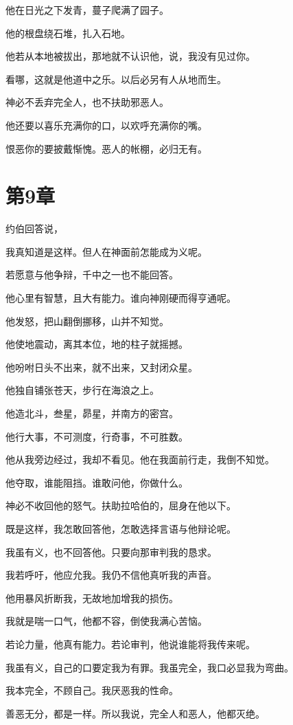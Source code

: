 \documentclass[12pt,oneside]{book}
\begin{document}
他在日光之下发青，蔓子爬满了园子。

他的根盘绕石堆，扎入石地。

他若从本地被拔出，那地就不认识他，说，我没有见过你。

看哪，这就是他道中之乐。以后必另有人从地而生。

神必不丢弃完全人，也不扶助邪恶人。

他还要以喜乐充满你的口，以欢呼充满你的嘴。

恨恶你的要披戴惭愧。恶人的帐棚，必归无有。



\chapter{第9章}
约伯回答说，

我真知道是这样。但人在神面前怎能成为义呢。

若愿意与他争辩，千中之一也不能回答。

他心里有智慧，且大有能力。谁向神刚硬而得亨通呢。

他发怒，把山翻倒挪移，山并不知觉。

他使地震动，离其本位，地的柱子就摇撼。

他吩咐日头不出来，就不出来，又封闭众星。

他独自铺张苍天，步行在海浪之上。

他造北斗，叁星，昴星，并南方的密宫。

他行大事，不可测度，行奇事，不可胜数。

他从我旁边经过，我却不看见。他在我面前行走，我倒不知觉。

他夺取，谁能阻挡。谁敢问他，你做什么。

神必不收回他的怒气。扶助拉哈伯的，屈身在他以下。

既是这样，我怎敢回答他，怎敢选择言语与他辩论呢。

我虽有义，也不回答他。只要向那审判我的恳求。

我若呼吁，他应允我。我仍不信他真听我的声音。

他用暴风折断我，无故地加增我的损伤。

我就是喘一口气，他都不容，倒使我满心苦恼。

若论力量，他真有能力。若论审判，他说谁能将我传来呢。

我虽有义，自己的口要定我为有罪。我虽完全，我口必显我为弯曲。

我本完全，不顾自己。我厌恶我的性命。

善恶无分，都是一样。所以我说，完全人和恶人，他都灭绝。
\end{document}
